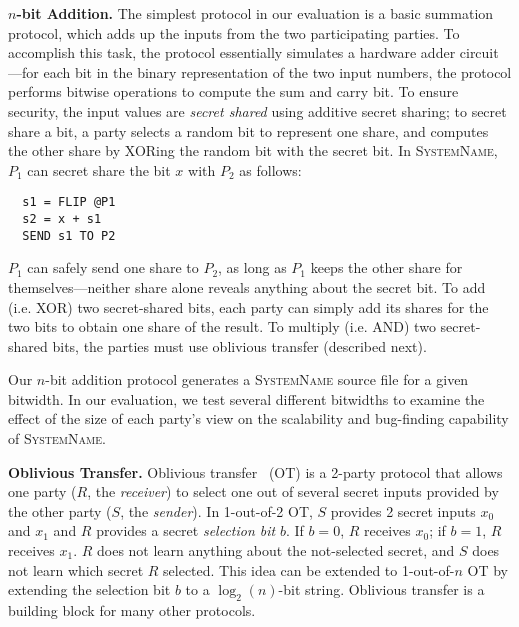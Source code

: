 \documentclass[conference]{IEEEtran}
\renewcommand{\paragraph}[1]{\vspace*{2pt}\noindent\textbf{#1}}
\newcommand{\system}{\textsc{SystemName}\xspace}
\begin{document}
\paragraph{$n$-bit Addition.}
The simplest protocol in our evaluation is a basic summation protocol, which adds up the inputs from the two participating parties. To accomplish this task, the protocol essentially simulates a hardware adder circuit---for each bit in the binary representation of the two input numbers, the protocol performs bitwise operations to compute the sum and carry bit. To ensure security, the input values are \emph{secret shared} using additive secret sharing; to secret share a bit, a party selects a random bit to represent one share, and computes the other share by XORing the random bit with the secret bit. In \system, $P_1$ can secret share the bit $x$ with $P_2$ as follows:
%
\begin{verbatim}
  s1 = FLIP @P1
  s2 = x + s1
  SEND s1 TO P2
\end{verbatim}
%
$P_1$ can safely send one share to $P_2$, as long as $P_1$ keeps the other share for themselves---neither share alone reveals anything about the secret bit. To add (i.e. XOR) two secret-shared bits, each party can simply add its shares for the two bits to obtain one share of the result. To multiply (i.e. AND) two secret-shared bits, the parties must use oblivious transfer (described next).

Our $n$-bit addition protocol generates a \system source file for a given bitwidth. In our evaluation, we test several different bitwidths to examine the effect of the size of each party's view on the scalability and bug-finding capability of \system.

\paragraph{Oblivious Transfer.}
Oblivious transfer~\cite{todo} (OT) is a 2-party protocol that allows one party ($R$, the \emph{receiver}) to select one out of several secret inputs provided by the other party ($S$, the \emph{sender}). In 1-out-of-2 OT, $S$ provides 2 secret inputs $x_0$ and $x_1$ and $R$ provides a secret \emph{selection bit} $b$. If $b=0$, $R$ receives $x_0$; if $b=1$, $R$ receives $x_1$. $R$ does not learn anything about the not-selected secret, and $S$ does not learn which secret $R$ selected. This idea can be extended to 1-out-of-$n$ OT by extending the selection bit $b$ to a $\log_2(n)$-bit string.
%
Oblivious transfer is a building block for many other protocols.
\end{document}

